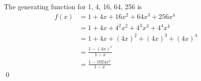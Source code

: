 The generating function for 1, 4, 16, 64, 256 is
\begin{align*}
f(x) &= 1 + 4x + 16x^2 + 64 x^3 + 256 x^4 \\
     &= 1 + 4x + 4^2x^2 + 4^3 x^3 + 4^4 x^4 \\
     &= 1 + 4x + (4x)^2 + (4x)^3 + (4x)^4 \\
     &= \frac{1 - (4x)^5}{1 - x} \\
     &= \frac{1 - 1024x^5}{1 - x}
\end{align*}
\qed
